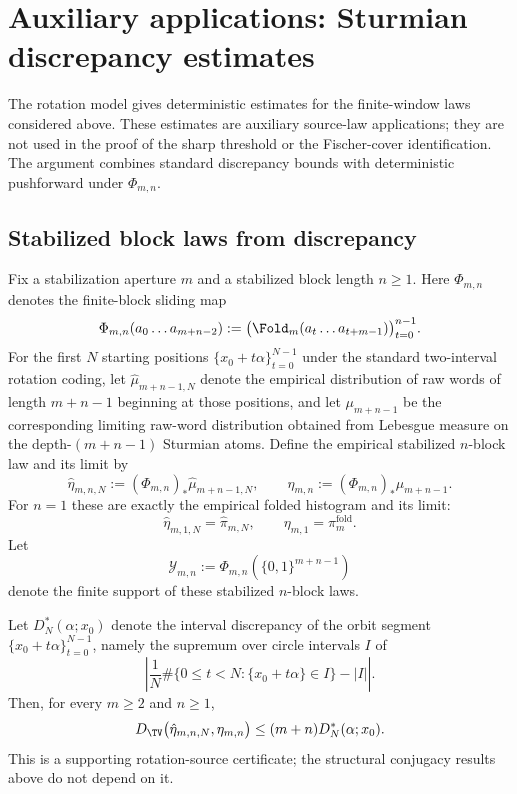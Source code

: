 \section{Auxiliary applications: Sturmian discrepancy estimates}\label{sec:fp:tv}

The rotation model gives deterministic estimates for the finite-window laws
considered above. These estimates are auxiliary source-law applications; they
are not used in the proof of the sharp threshold or the Fischer-cover
identification. The argument combines standard discrepancy bounds with
deterministic pushforward under $\Phi_{m,n}$.

\subsection{Stabilized block laws from discrepancy}

Fix a stabilization aperture $m$ and a stabilized block length $n\ge 1$. Here $\Phi_{m,n}$ denotes the finite-block sliding map
\[
\Phi_{m,n}(a_0\ldots a_{m+n-2})
:=
\bigl(\Fold_m(a_t\ldots a_{t+m-1})\bigr)_{t=0}^{n-1}.
\]
For the first $N$ starting positions $\{x_0+t\alpha\}_{t=0}^{N-1}$ under the standard two-interval rotation coding, let $\hat{\mu}_{m+n-1,N}$ denote the empirical distribution of raw words of length $m+n-1$ beginning at those positions, and let $\mu_{m+n-1}$ be the corresponding limiting raw-word distribution obtained from Lebesgue measure on the depth-$(m+n-1)$ Sturmian atoms. Define the empirical stabilized $n$-block law and its limit by
\[
\hat{\eta}_{m,n,N}:=(\Phi_{m,n})_*\hat{\mu}_{m+n-1,N},
\qquad
\eta_{m,n}:=(\Phi_{m,n})_*\mu_{m+n-1}.
\]
For $n=1$ these are exactly the empirical folded histogram and its limit:
\[
\hat{\eta}_{m,1,N}=\hat{\pi}_{m,N},
\qquad
\eta_{m,1}=\pi_m^{\mathrm{fold}}.
\]
Let
\[
\mathcal Y_{m,n}:=\Phi_{m,n}(\{0,1\}^{m+n-1})
\]
denote the finite support of these stabilized $n$-block laws.

\begin{theorem}\label{thm:tv-certificate}
Let $D_N^*(\alpha;x_0)$ denote the interval discrepancy of the orbit segment
$\{x_0+t\alpha\}_{t=0}^{N-1}$, namely the supremum over circle intervals $I$
of
\[
\left|
\frac1N\#\{0\le t<N:\{x_0+t\alpha\}\in I\}-|I|
\right|.
\]
Then, for every $m\ge2$ and $n\ge1$,
\[
D_{\TV}\bigl(\hat{\eta}_{m,n,N},\eta_{m,n}\bigr)
\le (m+n)D_N^*(\alpha;x_0).
\]
This is a supporting rotation-source certificate; the structural conjugacy
results above do not depend on it.
\end{theorem}

